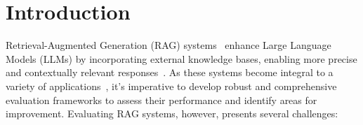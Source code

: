 \section{Introduction}





Retrieval-Augmented Generation (RAG) systems~\cite{lewis2020retrieval, gao2023retrieval} enhance Large Language Models (LLMs) by incorporating external knowledge bases, enabling more precise and contextually relevant responses~\cite{gao2023retrieval, yu2024evaluation, huang2024survey}. As these systems become integral to a variety of applications~\cite{zakka2024almanac, asai2023retrieval, guo2023retrieval},
it's imperative to develop robust and comprehensive evaluation frameworks to assess their performance and identify areas for improvement.
Evaluating RAG systems, however, presents several challenges:

